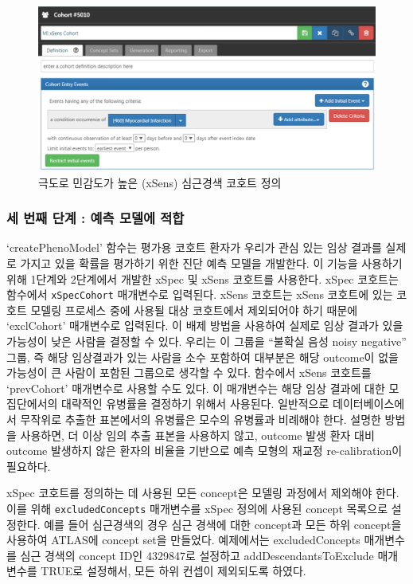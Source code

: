 \documentclass[10.5pt]{book}
\theoremstyle{definition}
\theoremstyle{definition}
\theoremstyle{definition}
\theoremstyle{remark}
\begin{document}
\begin{figure}

{\centering \includegraphics[width=1\linewidth]{images/ClinicalValidity/xSens} 

}

\caption{극도로 민감도가 높은 (xSens) 심근경색 코호트 정의}\label{fig:xSens}
\end{figure}

\subsubsection*{세 번째 단계 : 예측 모델에 적합}\label{-----}

`createPhenoModel' 함수는 평가용 코호트 환자가 우리가 관심 있는 임상
결과를 실제로 가지고 있을 확률을 평가하기 위한 진단 예측 모델을
개발한다. 이 기능을 사용하기 위해 1단계와 2단계에서 개발한 xSpec 및
xSens 코호트를 사용한다. xSpec 코호트는 함수에서 \texttt{xSpecCohort}
매개변수로 입력된다. xSens 코호트는 xSens 코호트에 있는 코호트 모델링
프로세스 중에 사용될 대상 코호트에서 제외되어야 하기 때문에 `exclCohort'
매개변수로 입력된다. 이 배제 방법을 사용하여 실제로 임상 결과가 있을
가능성이 낮은 사람을 결정할 수 있다. 우리는 이 그룹을 ``불확실 음성
noisy negative'' 그룹, 즉 해당 임상결과가 있는 사람을 소수 포함하여
대부분은 해당 outcome이 없을 가능성이 큰 사람이 포함된 그룹으로 생각할
수 있다. 함수에서 xSens 코호트를 `prevCohort' 매개변수로 사용할 수도
있다. 이 매개변수는 해당 임상 결과에 대한 모집단에서의 대략적인 유병률을
결정하기 위해서 사용된다. 일반적으로 데이터베이스에서 무작위로 추출한
표본에서의 유병률은 모수의 유병률과 비례해야 한다. 설명한 방법을
사용하면, 더 이상 임의 추출 표본을 사용하지 않고, outcome 발생 환자 대비
outcome 발생하지 않은 환자의 비율을 기반으로 예측 모형의 재교정
re-calibration이 필요하다.

xSpec 코호트를 정의하는 데 사용된 모든 concept은 모델링 과정에서
제외해야 한다. 이를 위해 \texttt{excludedConcepts} 매개변수를 xSpec
정의에 사용된 concept 목록으로 설정한다. 예를 들어 심근경색의 경우 심근
경색에 대한 concept과 모든 하위 concept을 사용하여 ATLAS에 concept set을
만들었다. 예제에서는 excludedConcepts 매개변수를 심근 경색의 concept
ID인 4329847로 설정하고 addDescendantsToExclude 매개변수를 TRUE로
설정해서, 모든 하위 컨셉이 제외되도록 하였다.
\end{document}
